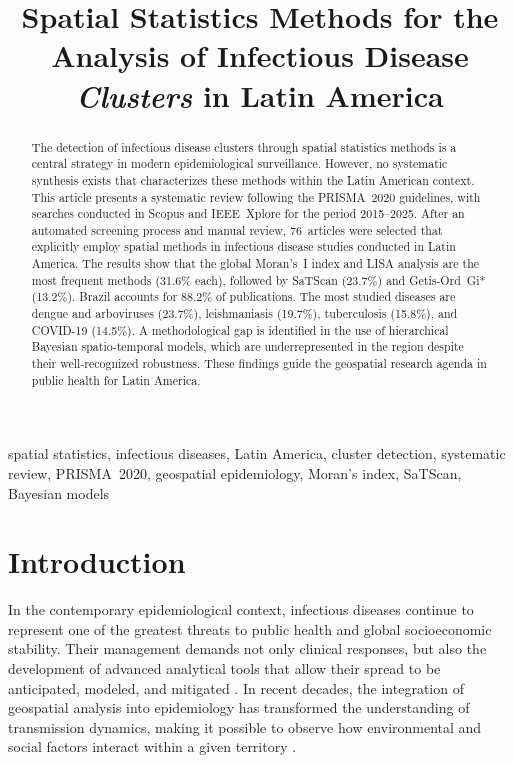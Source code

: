 \documentclass[conference]{IEEEtran}
\title{Spatial Statistics Methods for the Analysis of
  Infectious Disease \textit{Clusters} in Latin America}
\author{
  \IEEEauthorblockN{Jhon Cristhian Gonzales Quispe}
  \IEEEauthorblockA{
    \textit{Faculty of Statistical and Computer Engineering}\\
    \textit{Universidad Nacional del Altiplano}\\
    Puno, Per\'u\\
    j.gonzales@est.unap.edu.pe
  }
}
\begin{document}
\maketitle
\begin{abstract}
The detection of infectious disease clusters through spatial
statistics methods is a central strategy in modern
epidemiological surveillance. However, no systematic synthesis
exists that characterizes these methods within the Latin American
context. This article presents a systematic review following the
PRISMA~2020 guidelines, with searches conducted in Scopus and
IEEE~Xplore for the period 2015--2025. After an automated
screening process and manual review, 76~articles were selected
that explicitly employ spatial methods in infectious disease
studies conducted in Latin America. The results show that the
global Moran's~I index and LISA analysis are the most frequent
methods (31.6\% each), followed by SaTScan (23.7\%) and
Getis-Ord~Gi* (13.2\%). Brazil accounts for 88.2\% of
publications. The most studied diseases are dengue and
arboviruses (23.7\%), leishmaniasis (19.7\%), tuberculosis
(15.8\%), and COVID-19 (14.5\%). A methodological gap is
identified in the use of hierarchical Bayesian
spatio-temporal models, which are underrepresented in the
region despite their well-recognized robustness. These findings
guide the geospatial research agenda in public health for
Latin America.
\end{abstract}

\begin{IEEEkeywords}
spatial statistics, infectious diseases, Latin America,
cluster detection, systematic review,
PRISMA~2020, geospatial epidemiology, Moran's index,
SaTScan, Bayesian models
\end{IEEEkeywords}

\section{Introduction}

In the contemporary epidemiological context, infectious
diseases continue to represent one of the greatest threats to
public health and global socioeconomic stability. Their
management demands not only clinical responses, but also the
development of advanced analytical tools that allow their
spread to be anticipated, modeled, and mitigated
\cite{Delmelle2023}. In recent decades, the integration of
geospatial analysis into epidemiology has transformed the
understanding of transmission dynamics, making it possible to
observe how environmental and social factors interact within
a given territory \cite{Lin2022}.
\end{document}
